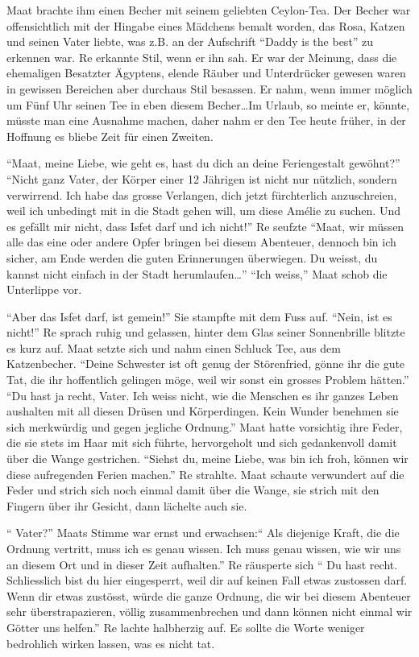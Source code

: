 \documentclass[11pt,titlepage,a5paper]{book}
\begin{document}
Maat brachte ihm einen Becher mit seinem geliebten Ceylon-Tea. Der Becher war offensichtlich mit der Hingabe eines Mädchens bemalt worden, das Rosa, Katzen und seinen Vater liebte, was z.B. an der Aufschrift "`Daddy is the best"' zu erkennen war. Re erkannte Stil, wenn er ihn sah. Er war der Meinung, dass die ehemaligen Besatzter Ägyptens, elende Räuber und Unterdrücker gewesen waren in gewissen Bereichen aber durchaus Stil besassen. Er nahm, wenn immer möglich um Fünf Uhr seinen Tee in eben diesem Becher\dots Im Urlaub, so meinte er, könnte, müsste man eine Ausnahme machen, daher nahm er den Tee heute früher, in der Hoffnung es bliebe Zeit für einen Zweiten.

"`Maat, meine Liebe, wie geht es, hast du dich an deine Feriengestalt gewöhnt?"' "`Nicht ganz Vater, der Körper einer 12 Jährigen ist nicht nur nützlich, sondern verwirrend. Ich habe das grosse Verlangen, dich jetzt fürchterlich anzuschreien, weil ich unbedingt mit in die Stadt gehen will, um diese Amélie zu suchen. Und es gefällt mir nicht, dass Isfet darf und ich nicht!"' Re seufzte "`Maat, wir müssen alle das eine oder andere Opfer bringen bei diesem Abenteuer, dennoch bin ich sicher, am Ende werden die guten Erinnerungen überwiegen. Du weisst, du kannst nicht einfach in der Stadt herumlaufen\dots "' "`Ich weiss,"' Maat schob die Unterlippe vor.

 "`Aber das Isfet darf, ist gemein!"' Sie stampfte mit dem Fuss auf. "`Nein, ist es nicht!"' Re sprach ruhig und gelassen, hinter dem Glas seiner Sonnenbrille blitzte es kurz auf. Maat setzte sich und nahm einen Schluck Tee, aus dem Katzenbecher. "`Deine Schwester ist oft genug der Störenfried, gönne ihr die gute Tat, die ihr hoffentlich gelingen möge, weil wir sonst ein grosses Problem hätten."' "`Du hast ja recht, Vater. Ich weiss nicht, wie die Menschen es ihr ganzes Leben aushalten mit all diesen Drüsen und Körperdingen. Kein Wunder benehmen sie sich merkwürdig und gegen jegliche Ordnung."' Maat hatte vorsichtig ihre Feder, die sie stets im Haar mit sich führte, hervorgeholt und sich gedankenvoll damit über die Wange gestrichen. "`Siehst du, meine Liebe, was bin ich froh, können wir diese aufregenden Ferien machen."' Re strahlte. Maat schaute verwundert auf die Feder und strich sich noch einmal damit über die Wange, sie strich mit den Fingern über ihr Gesicht, dann lächelte auch sie.
 
"` Vater?"' Maats Stimme war ernst und erwachsen:"` Als diejenige Kraft, die die Ordnung vertritt, muss ich es genau wissen. Ich muss genau wissen, wie wir uns an diesem Ort und in dieser Zeit aufhalten."' Re räusperte sich "` Du hast recht. Schliesslich bist du hier eingesperrt, weil dir auf keinen Fall etwas zustossen darf. Wenn dir etwas zustösst, würde die ganze Ordnung, die wir bei diesem Abenteuer sehr überstrapazieren, völlig zusammenbrechen und dann können nicht einmal wir Götter uns helfen."' Re lachte halbherzig auf. Es sollte die Worte weniger bedrohlich wirken lassen, was es nicht tat.
\end{document}
